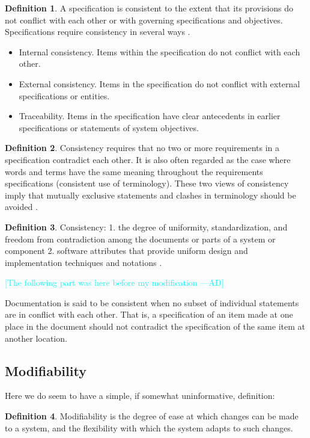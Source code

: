 \documentclass[letterpaper,cleveref]{lipics-v2019}
\newcommand{\authornote}[3]{\textcolor{#1}{[#3 ---#2]}}
\newcommand{\authornote}[3]{}
\newcommand{\ad}[1]{\authornote{cyan}{AD}{#1}} %
\theoremstyle{definition}
\newtheorem{defn}{Definition}
\begin{document}
\begin{defn}
A specification is consistent to the extent that its provisions do not conflict with each other or with governing specifications and objectives. Specifications require consistency in several ways \citep{Boehm1984}.
\begin{itemize}
\item Internal consistency. Items within the specification do not conflict with each other.
\item External consistency. Items in the specification do not conflict with external specifications or entities.
\item Traceability. Items in the specification have clear antecedents in earlier specifications or statements of system objectives.
\end{itemize}
\end{defn}
\begin{defn}
Consistency requires that no two or more requirements in a specification contradict each other. It is also often regarded as the case where words and terms have the same meaning throughout the requirements specifications (consistent use of terminology). These two views of consistency imply that mutually exclusive statements and clashes in terminology should be avoided \citep{ZOWGHI2003}.
\end{defn}
\begin{defn}
\label{ConsistencySelected}
Consistency: 1. the degree of uniformity, standardization, and freedom from contradiction among the documents or parts of a system or component 2. software attributes that provide uniform design and implementation techniques and notations \citep{ISO/IEC/IEEE24765}.
\end{defn}

\ad{The following part was here before my modification}

Documentation is said to be consistent when no subset of individual statements are in conflict with each other. That is, a specification of an item made at one place in the document should not contradict the specification of the same item at another location.

\subsection{Modifiability}

Here we do seem to have a simple, if somewhat uninformative, definition:

\begin{defn}
Modifiability is the degree of ease at which changes can be made to a system,
and the flexibility with which the system adapts to such changes.
\end{defn}
\end{document}
